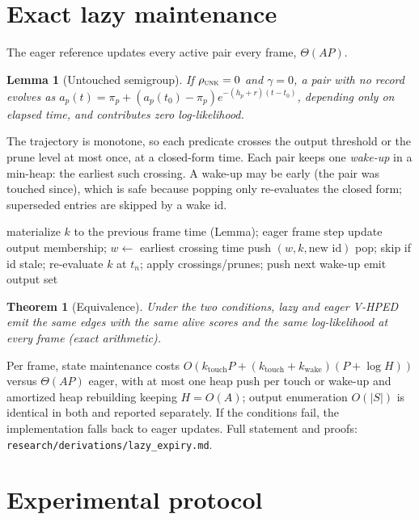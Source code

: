 \documentclass[10pt]{article}
\newtheorem{lemma}{Lemma}
\newtheorem{theorem}{Theorem}
\begin{document}
\section{Exact lazy maintenance}
\label{sec:lazy}
The eager reference updates every active pair every frame, $\Theta(AP)$.
\begin{lemma}[Untouched semigroup]
If $\rho_{\textsc{unk}}=0$ and $\gamma=0$, a pair with no record evolves as
$a_p(t)=\pi_p+(a_p(t_0)-\pi_p)e^{-(h_p+r)(t-t_0)}$, depending only on elapsed
time, and contributes zero log-likelihood.
\end{lemma}
The trajectory is monotone, so each predicate crosses the output threshold
or the prune level at most once, at a closed-form time. Each pair keeps one
\emph{wake-up} in a min-heap: the earliest such crossing. A wake-up may be
early (the pair was touched since), which is safe because popping only
re-evaluates the closed form; superseded entries are skipped by a wake id.
\begin{algorithm}[t]
\caption{Lazy V-HPED frame step}
\begin{algorithmic}[1]
  \State materialize $k$ to the previous frame time (Lemma); eager frame step
  \State update output membership; $w\gets$ earliest crossing time
   push $(w,k,\text{new id})$ \EndIf
\EndFor
{}
  \State pop; skip if id stale; re-evaluate $k$ at $t_n$; apply crossings/prunes; push next wake-up
\EndWhile
\State emit output set
\end{algorithmic}
\end{algorithm}
\begin{theorem}[Equivalence]
Under the two conditions, lazy and eager V-HPED emit the same edges with the
same alive scores and the same log-likelihood at every frame (exact
arithmetic).
\end{theorem}
Per frame, state maintenance costs
$O(k_{\text{touch}}P+(k_{\text{touch}}+k_{\text{wake}})(P+\log H))$ versus
$\Theta(AP)$ eager, with at most one heap push per touch or wake-up and
amortized heap rebuilding keeping $H=O(A)$; output enumeration $O(|S|)$ is
identical in both and reported separately. If the conditions fail, the
implementation falls back to eager updates. Full statement and proofs:
\texttt{research/derivations/lazy\_expiry.md}.

\section{Experimental protocol}
\end{document}
